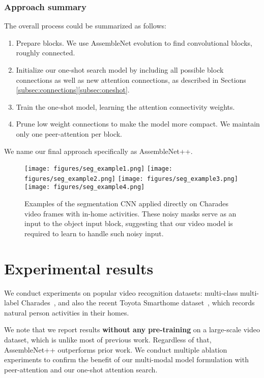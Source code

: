\documentclass[runningheads]{llncs}
\begin{document}
\subsubsection{Approach summary}
The overall process could be summarized as follows:
\begin{enumerate}
\item Prepare blocks. We use AssembleNet evolution to find convolutional blocks, roughly connected.
\item Initialize our one-shot search model by including all possible block connections as well as new attention connections, as described in Sections \ref{subsec:connections}\ref{subsec:oneshot}.
\item Train the one-shot model, learning the attention connectivity weights.
\item Prune low weight connections to make the model more compact. We maintain only one peer-attention per block.
\end{enumerate}

We name our final approach specifically as AssembleNet++.




\begin{figure}
  \centering
  \texttt{[image: figures/seg\_example1.png]}
  \texttt{[image: figures/seg\_example2.png]}
  \texttt{[image: figures/seg\_example3.png]}
  \texttt{[image: figures/seg\_example4.png]}
  \caption{Examples of the segmentation CNN applied directly on Charades video frames with in-home activities. These noisy masks serve as an input to the object input block, suggesting that our video model is required to learn to handle such noisy input.}
  \label{fig:seg-examples}
\end{figure}


\section{Experimental results}

We conduct experiments on popular video recognition datasets:
multi-class multi-label Charades~\cite{sigurdsson2018charadesego}, and also the recent Toyota Smarthome dataset~\cite{das2019toyota}, which records natural person activities in their homes. 

We note that we report results
\textbf{without any pre-training} on a large-scale video dataset, which is unlike most of previous work. Regardless of that, AssembleNet++ outperforms prior work. We conduct multiple ablation experiments to confirm the benefit of our multi-modal model formulation with peer-attention and our one-shot attention search.
\end{document}
